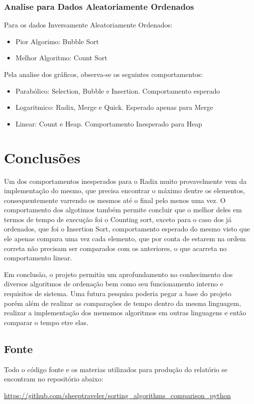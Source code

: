 \subsection{Analise para Dados Aleatoriamente Ordenados}
Para os dados Inversamente Aleatoriamente Ordenados:
\begin{itemize}
  \item Pior Algorimo: Bubble Sort
  \item Melhor Algoritmo: Count Sort 
\end{itemize}
Pela analise dos gráficos, observa-se os seguintes comportamentos:
\begin{itemize}
  \item Parabólico: Selection,  Bubble e Insertion. Comportamento esperado 
  \item Logaritmico: Radix, Merge e Quick. Esperado apenas para Merge 
  \item Linear: Count e Heap. Comportamento Inesperado para Heap
\end{itemize}

\chapter{Conclusões}
Um dos comportamentos inesperados para o Radix muito provavelmente vem da implementação do mesmo, que precisa encontrar o máximo dentre os elementos, consequentemente varrendo os mesmos até o final pelo menos uma vez. 
O comportamento dos algotimos também permite concluir que o melhor deles em termos de tempo de execução foi o Counting sort, exceto para o caso dos já ordenados, que foi o Insertion Sort, comportamento esperado do mesmo visto que ele apenas compara uma vez cada elemento, que por conta de estarem na ordem correta não precisam ser comparados com os anteriores, o que acarreta no comportamento linear.

Em conclusão, o projeto permitiu um aprofundamento no conhecimento dos diversos algoritmos de ordenação bem como seu funcionamento interno e requisitos de sistema. 
Uma futura pesquisa poderia pegar a base do projeto porém além de realizar as comparações de tempo dentro da mesma linguagem, realizar a implementação dos memsmos algoritmos em outras linguagens e então comparar o tempo etre elas.

\begin{appendices}
  \chapter{Fonte}
  Todo o código fonte e os materias utilizados para produção do relatório se encontram no repositório abaixo:

  \url{https://github.com/sheeptraveler/sorting\_algorithms\_comparison\_python}
\end{appendices}
